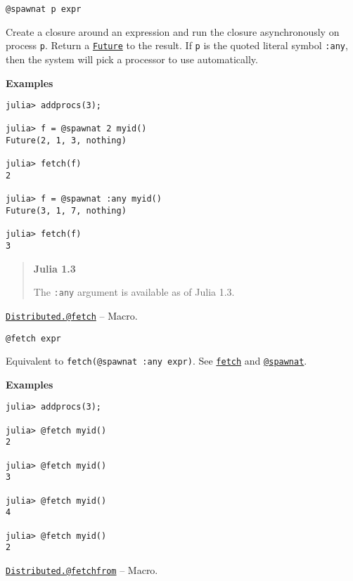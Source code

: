 \begin{adjustwidth}{2em}{0pt}


\begin{verbatim}
@spawnat p expr
\end{verbatim}

Create a closure around an expression and run the closure asynchronously on process \texttt{p}. Return a \hyperlink{4170271048165085864}{\texttt{Future}} to the result. If \texttt{p} is the quoted literal symbol \texttt{:any}, then the system will pick a processor to use automatically.

\textbf{Examples}


\begin{verbatim}
julia> addprocs(3);

julia> f = @spawnat 2 myid()
Future(2, 1, 3, nothing)

julia> fetch(f)
2

julia> f = @spawnat :any myid()
Future(3, 1, 7, nothing)

julia> fetch(f)
3
\end{verbatim}

\begin{quote}
\textbf{Julia 1.3}

The \texttt{:any} argument is available as of Julia 1.3.

\end{quote}


\end{adjustwidth}
\hypertarget{12924100318586144753}{}
\hyperlink{12924100318586144753}{\texttt{Distributed.@fetch}}  -- {Macro.}

\begin{adjustwidth}{2em}{0pt}


\begin{verbatim}
@fetch expr
\end{verbatim}

Equivalent to \texttt{fetch(@spawnat :any expr)}. See \hyperlink{11007884648860062495}{\texttt{fetch}} and \hyperlink{11231712027010946923}{\texttt{@spawnat}}.

\textbf{Examples}


\begin{verbatim}
julia> addprocs(3);

julia> @fetch myid()
2

julia> @fetch myid()
3

julia> @fetch myid()
4

julia> @fetch myid()
2
\end{verbatim}



\end{adjustwidth}
\hypertarget{4668231420319368373}{}
\hyperlink{4668231420319368373}{\texttt{Distributed.@fetchfrom}}  -- {Macro.}

